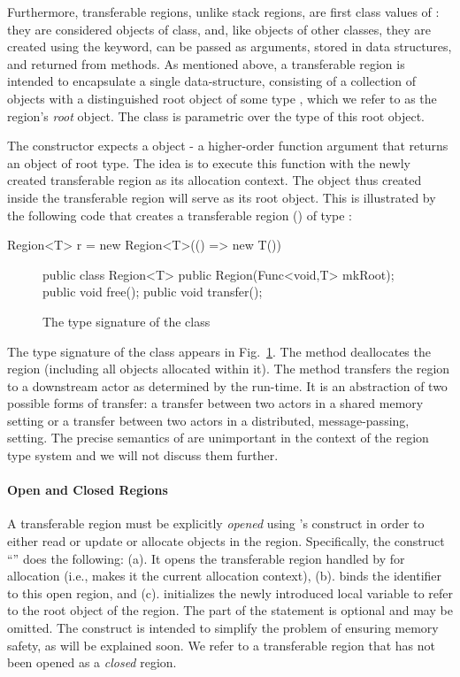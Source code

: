 Furthermore, transferable regions, unlike stack regions, are first class values of \name:
they are considered objects of  class, and, like objects of other
classes, they are created using the  keyword, can be passed as
arguments, stored in data structures, and returned from methods.
As mentioned above, a transferable region is intended to encapsulate a single
data-structure, consisting of a collection of objects with a distinguished root
object of some type , which we refer to as the region's \emph{root} object.
The class  is parametric over the type  of this root object.

The  constructor expects a 
object - a higher-order function argument that returns an object of
root type.  The idea is to execute this function with the newly
created transferable region as its allocation context. The object thus
created inside the transferable region will serve as its root object.
This is illustrated by the following code that creates a transferable region
() of type :
\begin{codejava}
  Region<T> r = new Region<T>(() => new T())
\end{codejava}


\begin{figure}
\begin{codejava}
  public class Region<T> {
    public Region(Func<void,T> mkRoot);
    public void free();
    public void transfer();
  }
\end{codejava}
\caption{The type signature of the  class}
\label{fig:region-class}
\end{figure}

The type signature of the class  appears in Fig.~\ref{fig:region-class}.
The method  deallocates the region (including all objects allocated within it).
The method  transfers the region to a downstream actor as determined by the run-time.
It is an abstraction of two possible forms of  transfer: a transfer between two actors in a shared
memory setting or a transfer between two actors in a distributed, message-passing, setting. 
The precise semantics of  are unimportant in the context of the region type
system and we will not discuss them further.

\paragraph{Open and Closed Regions}
A transferable region must be explicitly \emph{opened} using \name's  construct
in order to either read or update or allocate objects in the region.
Specifically, the construct ``'' does the following:
(a). It opens the transferable region handled by  for allocation
(i.e., makes it the current allocation context),
(b). binds the identifier  to this open region, and
(c). initializes the newly introduced local variable  to refer
to the root object of the region.
The  part of the statement is optional and may be omitted.
The  construct is intended to simplify the problem of ensuring memory safety,
as will be explained soon.
We refer to a transferable region that has not been opened as a \emph{closed} region.

